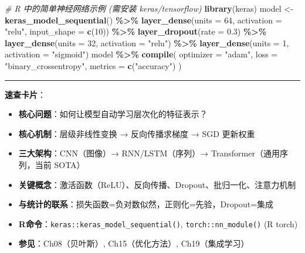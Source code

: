 \documentclass[
]{book}
\newenvironment{Shaded}{\begin{snugshade}}{\end{snugshade}}
\newcommand{\AttributeTok}[1]{\textcolor[rgb]{0.13,0.29,0.53}{#1}}
\newcommand{\CommentTok}[1]{\textcolor[rgb]{0.56,0.35,0.01}{\textit{#1}}}
\newcommand{\DecValTok}[1]{\textcolor[rgb]{0.00,0.00,0.81}{#1}}
\newcommand{\FloatTok}[1]{\textcolor[rgb]{0.00,0.00,0.81}{#1}}
\newcommand{\FunctionTok}[1]{\textcolor[rgb]{0.13,0.29,0.53}{\textbf{#1}}}
\newcommand{\NormalTok}[1]{#1}
\newcommand{\OtherTok}[1]{\textcolor[rgb]{0.56,0.35,0.01}{#1}}
\newcommand{\SpecialCharTok}[1]{\textcolor[rgb]{0.81,0.36,0.00}{\textbf{#1}}}
\newcommand{\StringTok}[1]{\textcolor[rgb]{0.31,0.60,0.02}{#1}}
\providecommand{\tightlist}{%
  \setlength{\itemsep}{0pt}\setlength{\parskip}{0pt}}
\begin{document}
\begin{Shaded}
\begin{Highlighting}[]
\CommentTok{\# R 中的简单神经网络示例 (需安装 keras/tensorflow)}
\FunctionTok{library}\NormalTok{(keras)}
\NormalTok{model }\OtherTok{\textless{}{-}} \FunctionTok{keras\_model\_sequential}\NormalTok{() }\SpecialCharTok{\%\textgreater{}\%}
  \FunctionTok{layer\_dense}\NormalTok{(}\AttributeTok{units =} \DecValTok{64}\NormalTok{, }\AttributeTok{activation =} \StringTok{"relu"}\NormalTok{, }\AttributeTok{input\_shape =} \FunctionTok{c}\NormalTok{(}\DecValTok{10}\NormalTok{)) }\SpecialCharTok{\%\textgreater{}\%}
  \FunctionTok{layer\_dropout}\NormalTok{(}\AttributeTok{rate =} \FloatTok{0.3}\NormalTok{) }\SpecialCharTok{\%\textgreater{}\%}
  \FunctionTok{layer\_dense}\NormalTok{(}\AttributeTok{units =} \DecValTok{32}\NormalTok{, }\AttributeTok{activation =} \StringTok{"relu"}\NormalTok{) }\SpecialCharTok{\%\textgreater{}\%}
  \FunctionTok{layer\_dense}\NormalTok{(}\AttributeTok{units =} \DecValTok{1}\NormalTok{, }\AttributeTok{activation =} \StringTok{"sigmoid"}\NormalTok{)}
\NormalTok{model }\SpecialCharTok{\%\textgreater{}\%} \FunctionTok{compile}\NormalTok{(}
  \AttributeTok{optimizer =} \StringTok{"adam"}\NormalTok{,}
  \AttributeTok{loss =} \StringTok{"binary\_crossentropy"}\NormalTok{,}
  \AttributeTok{metrics =} \FunctionTok{c}\NormalTok{(}\StringTok{"accuracy"}\NormalTok{)}
\NormalTok{)}
\end{Highlighting}
\end{Shaded}

\begin{center}\rule{0.5\linewidth}{0.5pt}\end{center}

\textbf{速查卡片}：

\begin{itemize}
\tightlist
\item
  \textbf{核心问题}：如何让模型自动学习层次化的特征表示？
\item
  \textbf{核心机制}：层级非线性变换 → 反向传播求梯度 → SGD 更新权重
\item
  \textbf{三大架构}：CNN（图像）→ RNN/LSTM（序列）→ Transformer（通用序列，当前 SOTA）
\item
  \textbf{关键概念}：激活函数（ReLU）、反向传播、Dropout、批归一化、注意力机制
\item
  \textbf{与统计的联系}：损失函数=负对数似然，正则化=先验，Dropout=集成
\item
  \textbf{R命令}：\texttt{keras::keras\_model\_sequential()}, \texttt{torch::nn\_module()} (R torch)
\item
  \textbf{参见}：Ch08（贝叶斯）, Ch15（优化方法）, Ch19（集成学习）
\end{itemize}
\end{document}
